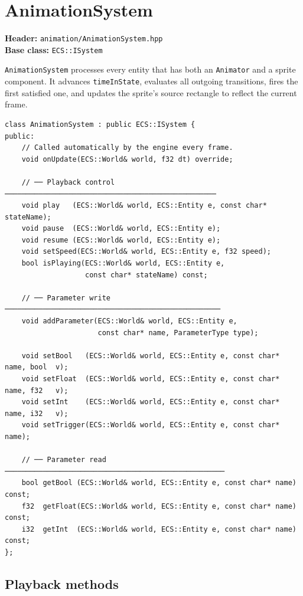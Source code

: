 \section{AnimationSystem}

\textbf{Header:} \texttt{animation/AnimationSystem.hpp}\\
\textbf{Base class:} \texttt{ECS::ISystem}

\texttt{AnimationSystem} processes every entity that has both an
\texttt{Animator} and a sprite component. It advances \texttt{timeInState},
evaluates all outgoing transitions, fires the first satisfied one, and updates
the sprite's source rectangle to reflect the current frame.

\begin{lstlisting}
class AnimationSystem : public ECS::ISystem {
public:
    // Called automatically by the engine every frame.
    void onUpdate(ECS::World& world, f32 dt) override;

    // ── Playback control ──────────────────────────────────────────────────
    void play   (ECS::World& world, ECS::Entity e, const char* stateName);
    void pause  (ECS::World& world, ECS::Entity e);
    void resume (ECS::World& world, ECS::Entity e);
    void setSpeed(ECS::World& world, ECS::Entity e, f32 speed);
    bool isPlaying(ECS::World& world, ECS::Entity e,
                   const char* stateName) const;

    // ── Parameter write ───────────────────────────────────────────────────
    void addParameter(ECS::World& world, ECS::Entity e,
                      const char* name, ParameterType type);

    void setBool   (ECS::World& world, ECS::Entity e, const char* name, bool  v);
    void setFloat  (ECS::World& world, ECS::Entity e, const char* name, f32   v);
    void setInt    (ECS::World& world, ECS::Entity e, const char* name, i32   v);
    void setTrigger(ECS::World& world, ECS::Entity e, const char* name);

    // ── Parameter read ────────────────────────────────────────────────────
    bool getBool (ECS::World& world, ECS::Entity e, const char* name) const;
    f32  getFloat(ECS::World& world, ECS::Entity e, const char* name) const;
    i32  getInt  (ECS::World& world, ECS::Entity e, const char* name) const;
};
\end{lstlisting}

\subsection{Playback methods}

